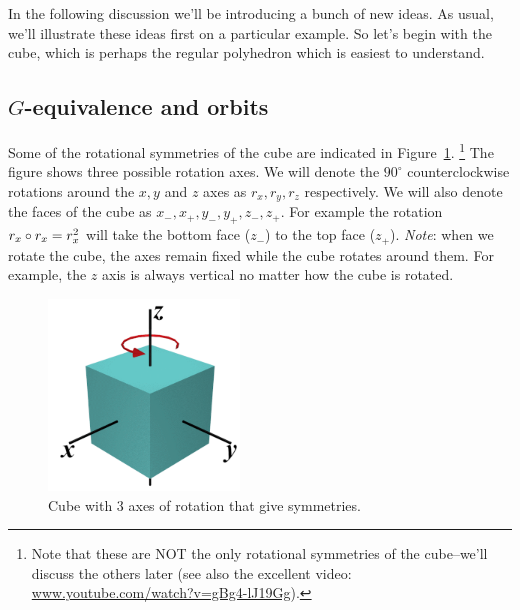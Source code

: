 In the following discussion we'll be introducing a bunch of new ideas. As usual, we'll illustrate these ideas first on a particular example. So let's begin with the cube, which is perhaps the regular polyhedron which is easiest to understand.

\subsection{$G$-equivalence and orbits}
Some of the rotational symmetries of the cube are indicated in Figure~\ref{fig:CubeRot}.
\footnote{Note that these are NOT the only rotational symmetries of the cube--we'll discuss the others later (see also the excellent video: \url{www.youtube.com/watch?v=gBg4-lJ19Gg}).}
The figure shows three possible rotation axes. We will denote the $90^{\circ}$ counterclockwise rotations around the $x,y$ and $z$ axes as $r_x, r_y,r_z$ respectively.  We will also denote the faces of the cube as $x_-, x_+,y_-,y_+,z_-,z_+$.  For example the rotation $r_x\circ r_x=r_x^2$ will take the bottom face ($z_-$) to the top face ($z_+$). \emph{Note}:  when we rotate the cube, the axes remain fixed while the cube rotates around them.  For example, the $z$ axis is always vertical no matter how the cube is rotated.

\begin{figure}[ht]
\begin{center}
\includegraphics[width=2in]{images/AxesOfCube.png}
\caption{Cube with 3 axes of rotation that give symmetries.}\label{fig:CubeRot}
\end{center}
\end{figure}


